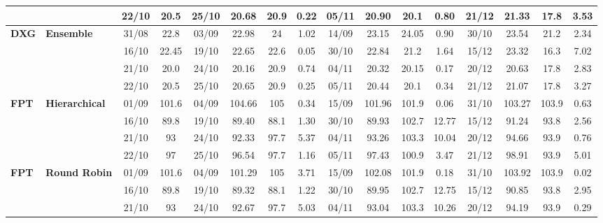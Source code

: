 \begin{table}[!h]
\begin{tabular}{llcc|cccc|cccc|cccc}
&
& 22/10 & 20.5 & 25/10 & 20.68 & 20.9 & 0.22 & 05/11 & 20.90 & 20.1 & 0.80 & 21/12 & 21.33 & 17.8 & 3.53 \\
\midrule


\multirow{4}{*}{\textbf{DXG}} 
& \textbf{Ensemble}
& 31/08 & 22.8 & 03/09 & 22.98 & 24 & 1.02 & 14/09 & 23.15 & 24.05 & 0.90 & 30/10 & 23.54 & 21.2 & 2.34 \\

&
& 16/10 & 22.45 & 19/10 & 22.65 & 22.6 & 0.05 & 30/10 & 22.84 & 21.2 & 1.64 & 15/12 & 23.32 & 16.3 & 7.02 \\

&
& 21/10 & 20.0 & 24/10 & 20.16 & 20.9 & 0.74 & 04/11 & 20.32 & 20.15 & 0.17 & 20/12 & 20.63 & 17.8 & 2.83 \\

&
& 22/10 & 20.5 & 25/10 & 20.65 & 20.9 & 0.25 & 05/11 & 20.44 & 20.1 & 0.34 & 21/12 & 21.07 & 17.8 & 3.27 \\
\midrule



\multirow{4}{*}{\textbf{FPT}} 
& \textbf{Hierarchical}
& 01/09 & 101.6 & 04/09 & 104.66 & 105 & 0.34 & 15/09 & 101.96 & 101.9 & 0.06 & 31/10 & 103.27 & 103.9 & 0.63 \\

&
& 16/10 & 89.8 & 19/10 & 89.40 & 88.1 & 1.30 & 30/10 & 89.93 & 102.7 & 12.77 & 15/12 & 91.24 & 93.8 & 2.56 \\

&
& 21/10 & 93 & 24/10 & 92.33 & 97.7 & 5.37 & 04/11 & 93.26 & 103.3 & 10.04 & 20/12 & 94.66 & 93.9 & 0.76 \\

&
& 22/10 & 97 & 25/10 & 96.54 & 97.7 & 1.16 & 05/11 & 97.43 & 100.9 & 3.47 & 21/12 & 98.91 & 93.9 & 5.01 \\
\midrule


\multirow{4}{*}{\textbf{FPT}} 
& \textbf{Round Robin}
& 01/09 & 101.6 & 04/09 & 101.29 & 105 & 3.71 & 15/09 & 102.08 & 101.9 & 0.18 & 31/10 & 103.92 & 103.9 & 0.02 \\

&
& 16/10 & 89.8 & 19/10 & 89.32 & 88.1 & 1.22 & 30/10 & 89.95 & 102.7 & 12.75 & 15/12 & 90.85 & 93.8 & 2.95 \\

&
& 21/10 & 93 & 24/10 & 92.67 & 97.7 & 5.03 & 04/11 & 93.04 & 103.3 & 10.26 & 20/12 & 94.19 & 93.9 & 0.29 \\


\end{tabular}
\end{table}
